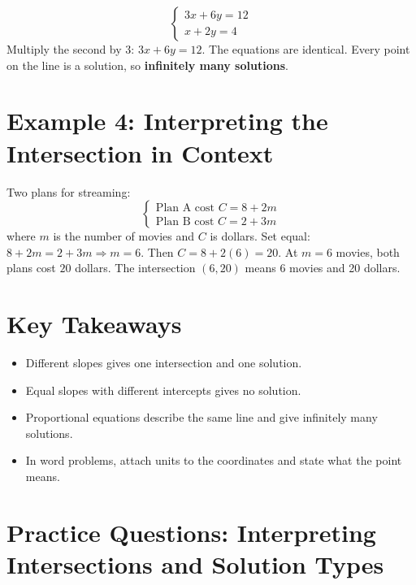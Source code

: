 \documentclass[14pt]{extarticle}
\begin{document}
\[
\begin{cases}
3x + 6y = 12\\
x + 2y = 4
\end{cases}
\]
Multiply the second by 3: \(3x + 6y = 12\). The equations are identical.  
Every point on the line is a solution, so \textbf{infinitely many solutions}.

\section*{Example 4: Interpreting the Intersection in Context}

Two plans for streaming:
\[
\begin{cases}
\text{Plan A cost } C = 8 + 2m\\
\text{Plan B cost } C = 2 + 3m
\end{cases}
\]
where \(m\) is the number of movies and \(C\) is dollars.  
Set equal: \(8 + 2m = 2 + 3m \Rightarrow m = 6\). Then \(C = 8 + 2(6) = 20\).  
At \(m=6\) movies, both plans cost \(20\) dollars. The intersection \((6, 20)\) means 6 movies and 20 dollars.

\section*{Key Takeaways}
\begin{itemize}
    \item Different slopes gives one intersection and one solution.
    \item Equal slopes with different intercepts gives no solution.
    \item Proportional equations describe the same line and give infinitely many solutions.
    \item In word problems, attach units to the coordinates and state what the point means.
\end{itemize}

\newpage


\section*{Practice Questions: Interpreting Intersections and Solution Types}
\end{document}
